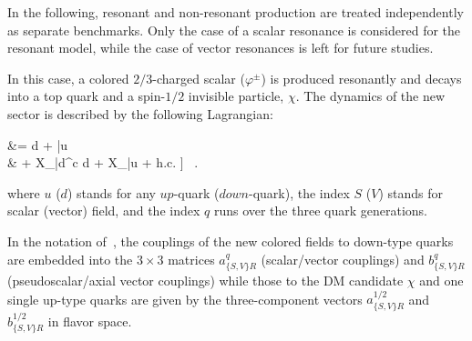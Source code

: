 In the following, resonant and non-resonant production are treated independently as separate benchmarks. 
Only the case of a scalar resonance is considered for the resonant model, while the case of vector resonances is left for future studies. 

\label{sec:ResonantProd}

In this case, a colored $2/3$-charged scalar ($\varphi^{\pm}$) is produced resonantly and decays into a top quark and a spin-$1/2$ invisible particle, $\chi$.  The dynamics of the new sector is described by the following Lagrangian:

\be\label{eq:lagrangianResonant}\bsp
\lag &=
\bigg[
\varphi \bar d^c
\Big[a^q_{SR} + b^q_{SR} \gamma_5 \Big] d +
\varphi \bar u  \chi
%
\\ &
+ X_\mu \bar d^c\gmu
{} d
%
+ X_\mu \bar u \gmu
{} \chi + 
{\rm h.c.} \bigg] \ .
\esp\ee


where $u$ ($d$) stands for any $up$-quark ($down$-quark), 
the index $S$ ($V$) stands for scalar (vector) field, and the index $q$ 
runs over the three quark generations. 


In the notation of~\cite{Agram:2013wda}, 
the couplings of the new colored fields to down-type quarks are
embedded into the $3\times 3$ matrices
$a^q_{\{S,V\}R}$ (scalar/vector couplings) and $b^q_{\{S,V\}R}$ (pseudoscalar/axial vector couplings)
while those to the DM candidate $\chi$ and one
single up-type quarks are given by the three-component vectors
$a^{1/2}_{\{S,V\}R}$ and $b^{1/2}_{\{S,V\}R}$
in flavor space. 

